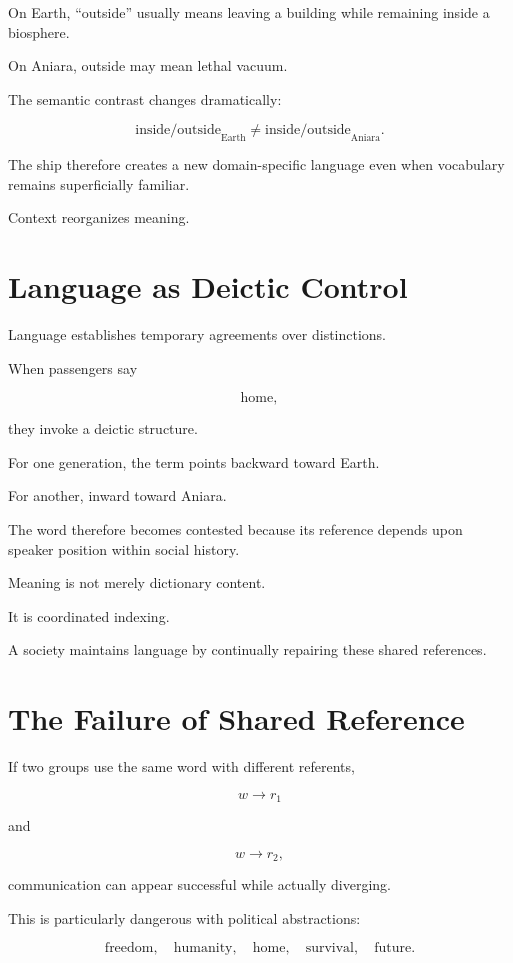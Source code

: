 \documentclass[11pt,oneside]{book}
\theoremstyle{definition}
\theoremstyle{remark}
\begin{document}
On Earth, ``outside'' usually means leaving a building while remaining inside a biosphere.

On Aniara, outside may mean lethal vacuum.

The semantic contrast changes dramatically:

\[
\text{inside/outside}_{\mathrm{Earth}}
\neq
\text{inside/outside}_{\mathrm{Aniara}}.
\]

The ship therefore creates a new domain-specific language even when vocabulary remains superficially familiar.

Context reorganizes meaning.

\section{Language as Deictic Control}

Language establishes temporary agreements over distinctions.

When passengers say

\[
\text{home},
\]

they invoke a deictic structure.

For one generation, the term points backward toward Earth.

For another, inward toward Aniara.

The word therefore becomes contested because its reference depends upon speaker position within social history.

Meaning is not merely dictionary content.

It is coordinated indexing.

A society maintains language by continually repairing these shared references.

\section{The Failure of Shared Reference}

If two groups use the same word with different referents,

\[
w\rightarrow r_1
\]

and

\[
w\rightarrow r_2,
\]

communication can appear successful while actually diverging.

This is particularly dangerous with political abstractions:

\[
\text{freedom},
\quad
\text{humanity},
\quad
\text{home},
\quad
\text{survival},
\quad
\text{future}.
\]
\end{document}
